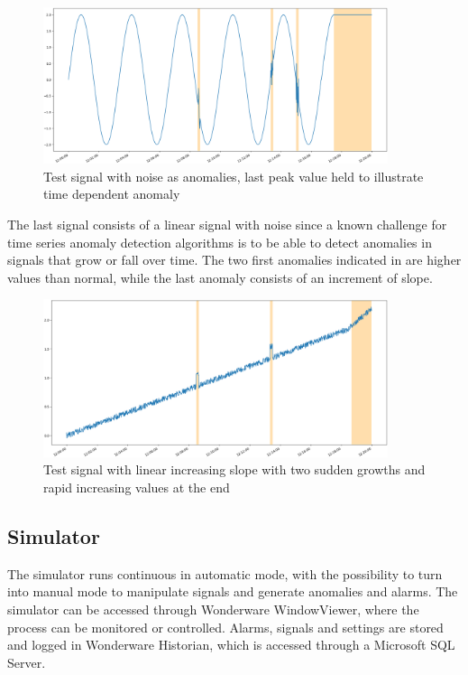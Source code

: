 \documentclass[english, a4paper]{report}
\begin{document}
{{{            \begin{figure}[H]
                \centering
                \includegraphics[width=0.9\textwidth]{AnomType3}
                \caption{Test signal with noise as anomalies, last peak value held to illustrate time dependent anomaly}
                \label{fig:AnomType3}
            \end{figure}
            
            The last signal consists of a linear signal with noise since a known challenge for time series anomaly detection algorithms is to be able to detect anomalies in signals that grow or fall over time. The two first anomalies indicated in  are higher values than normal, while the last anomaly consists of an increment of slope. 
            
            \begin{figure}[H]
                \centering
                \includegraphics[width=0.9\textwidth]{AnomType4}
                \caption{Test signal with linear increasing slope with two sudden growths and rapid increasing values at the end}
                \label{fig:AnomType4}
            \end{figure}
        }
        
        \subsection{Simulator} \label{simulator}
        {
            The simulator runs continuous in automatic mode, with the possibility to turn into manual mode to manipulate signals and generate anomalies and alarms. The simulator can be accessed through Wonderware WindowViewer, where the process can be monitored or controlled. Alarms, signals and settings are stored and logged in Wonderware Historian, which is accessed through a Microsoft SQL Server.
            
}}}
\end{document}
